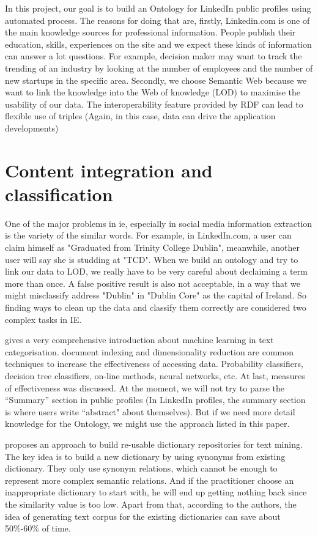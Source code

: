 In this project, our goal is to build an Ontology for LinkedIn public profiles using automated process. The reasons for doing that are, firstly, Linkedin.com is one of the main knowledge sources for professional information. People publish their education, skills, experiences on the site and we expect these kinds of information can answer a lot questions. For example, decision maker may want to track the trending of an industry by looking at the number of employees and the number of new startups in the specific area. Secondly, we choose Semantic Web because we want to link the knowledge into the Web of knowledge (LOD) to maximise the usability of our data.  The interoperability feature provided by RDF can lead to flexible use of triples (Again, in this case, data can drive the application developments)

\section{Content integration and classification}


One of the major problems in \gls{ie}, especially in social media information extraction is the variety of the similar words. For example,  in LinkedIn.com, a user can claim himself as "Graduated from Trinity College Dublin", meanwhile, another user will say she is studding at "TCD". When we build an ontology and try to link our data to LOD, we really have to be very careful about declaiming a term more than once. A false positive result is also not acceptable, in a way that we might misclassify address "Dublin" in "Dublin Core" as the capital of Ireland. So finding ways to clean up the data and classify them correctly are considered two complex tasks in IE.

\cite{sebastiani2002} gives a very comprehensive introduction about machine learning in text categorisation. document indexing and dimensionality reduction are common techniques to increase the effectiveness of accessing data. Probability classifiers, decision tree classifiers, on-line methods, neural networks, etc. At last, measures of effectiveness was discussed. At the moment, we will not try to parse the ``Summary'' section in public profiles (In LinkedIn profiles, the summary section is where users write ``abstract" about themselves). But if we need more detail knowledge for the Ontology, we might use the approach listed in this paper.

\cite{godbole2010} proposes an approach to build re-usable dictionary repositories for text mining. The key idea is to build a new dictionary by using synonyms from existing dictionary. They only use synonym relations, which cannot be enough to represent more complex semantic relations. And if the practitioner choose an inappropriate dictionary to start with, he will end up getting nothing back since the similarity value is too low. Apart from that, according to the authors, the idea of generating text corpus for the existing dictionaries can save about 50\%-60\% of time.

